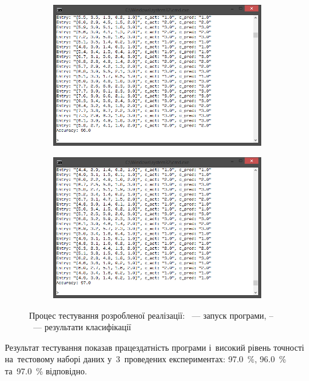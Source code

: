 \documentclass[
	a4paper,
	oneside,
	DIV = 12,
	fontsize = 13pt,
	headings = normal,
	numbers = endperiod,
	bibliography = totoc, %
]{scrartcl}
\theoremstyle{mythm}
\begin{document}
\begin{figure}[!htbp]
\begin{subfigure}[b]{0.5\columnwidth - 0.5em}
							\includegraphics[width = \columnwidth]{./assets/y03s01-syssoft-term-paper-01-p03.png}
							\caption{}
							\label{subfig:nbc-res-02}
						\end{subfigure}\quad%
						\begin{subfigure}[b]{0.5\columnwidth - 0.5em}
							\centering
							\includegraphics[width = \columnwidth]{./assets/y03s01-syssoft-term-paper-01-p04.png}
							\caption{}
							\label{subfig:nbc-res-03}
						\end{subfigure}
						\caption{Процес тестування розробленої реалізації: ~— запуск програми, –~— результати класифікації}
						\label{fig:nbc-testing}
					\end{figure}

					Результат тестування показав працездатність програми і~високий рівень точності на~тестовому наборі даних у~3~проведених експериментах: \SI{97.0}{\percent}, \SI{96.0}{\percent} та~\SI{97.0}{\percent} відповідно.
\end{document}
